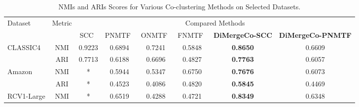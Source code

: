 \documentclass[journal]{IEEEtran}
\theoremstyle{definition}
\theoremstyle{remark} %
\renewcommand{\cite}[1]{~\autocite{#1}}
\begin{document}
\begin{table}[htbp]
    \centering
    \caption{NMIs and ARIs Scores for Various Co-clustering Methods on Selected Datasets.}
    \label{tab:evaluation-metrics}
    \begin{threeparttable}
        \begin{tabular}{@{} l c cccccc @{}}
            \toprule
            \multirow{2}{*}{Dataset}    & \multirow{2}{*}{Metric} & \multicolumn{6}{c}{Compared Methods}                                                                                                                                                                                                             \\
            \cmidrule{3-8}
                                        &                         & SCC\cite{dhillon2001CoclusteringDocumentsWords} & PNMTF\cite{chen2023ParallelNonNegativeMatrix} & ONMTF\cite{ding2006OrthogonalNonnegativeMatrix} & FNMTF\cite{kim2011FastNonnegativeMatrix} & \textbf{DiMergeCo-SCC} & \textbf{DiMergeCo-PNMTF} \\
            \midrule
            \multirow{2}{*}{CLASSIC4}   & NMI                     & 0.9223                                          & 0.6894                                        & 0.7241                                          & 0.5848                                   & \textbf{0.8650}        & 0.6609                   \\
                                        & ARI                     & 0.7713                                          & 0.6188                                        & 0.6696                                          & 0.4827                                   & \textbf{0.7763}        & 0.6057                   \\
            \multirow{2}{*}{Amazon}     & NMI                     & *                                               & 0.5944                                        & 0.5347                                          & 0.6750                                   & \textbf{0.7676}        & 0.6073                   \\
                                        & ARI                     & *                                               & 0.4523                                        & 0.4086                                          & 0.4820                                   & \textbf{0.5845}        & 0.4469                   \\
            \multirow{2}{*}{RCV1-Large} & NMI                     & *                                               & 0.6519                                        & 0.4288                                          & 0.4721                                   & \textbf{0.8349}        & 0.6348                   \\

\end{tabular}
\end{threeparttable}
\end{table}
\end{document}
